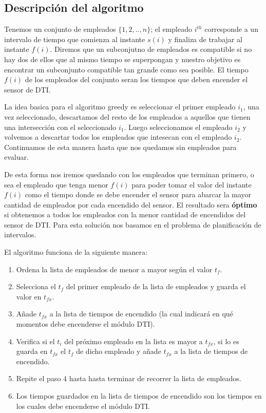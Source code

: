 \documentclass{article}
\begin{document}
\subsection{Descripción del algoritmo}

Tenemos un conjunto de empleados \(\{1,2,..,n\}\); el empleado \(i^{th}\) corresponde a un intervalo de tiempo que comienza al instante \(s(i)\) y finaliza de trabajar al instante \(f(i)\).
Diremos que un subconjutno de empleados es compatible si no hay dos de ellos que al mismo tiempo se superpongan y nuestro objetivo es encontrar un subconjunto compatible tan grande como sea posible.
El tiempo \(f(i)\) de los empleados del conjunto seran los tiempos que deben encender el sensor de DTI.

La idea basica para el algoritmo greedy es seleccionar el primer empleado \(i_1\), una vez seleccionado, descartamos del resto de los empleados a aquellos que tienen una intersección con el seleccionado \(i_1\).
Luego seleccionamos el empleado \(i_2\) y volvemos a descartar todos los empleados que intesecan con el empleado \(i_2\). Continuamos de esta manera hasta que nos quedamos sin empleados para evaluar.  

De esta forma nos iremos quedando con los empleados que terminan primero, o sea el empleado que tenga menor \(f(i)\) para poder tomar el valor del instante \(f(i)\) como el tiempo donde se debe encender el sensor para 
abarcar la mayor cantidad de empleados por cada encendido del sensor. El resultado sera \textbf{óptimo} si obtenemos a todos los empleados con la menor cantidad de encendidos del sensor de DTI. Para esta solución nos basamos en el problema de planificación de intervalos.

El algoritmo funciona de la siguiente manera:
\begin{enumerate}
    \item Ordena la lista de empleados de menor a mayor según el valor \(t_f\).
    \item Selecciona el \(t_f\) del primer empleado de la lista de empleados y guarda el valor en \(t_{fx}\).
    \item Añade \(t_{fx}\) a la lista de tiempos de encendido (la cual indicará en qué momentos debe encenderse el módulo DTI).
    \item Verifica si el \(t_i\) del próximo empleado en la lista es mayor a \(t_{fx}\), si lo es guarda en \(t_{fx}\) el \(t_f\) de dicho empleado y añade \(t_{fx}\) a la lista de tiempos de encendido.
    \item Repite el paso 4 hasta hasta terminar de recorrer la lista de empleados.
    \item Los tiempos guardados en la lista de tiempos de encendido son los tiempos en los cuales debe encenderse el módulo DTI.
    
\end{enumerate}
\end{document}
